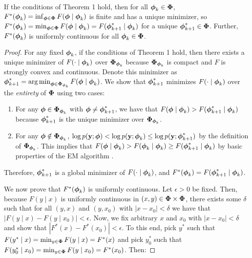 \begin{lemma}
    If the conditions of Theorem 1 hold, then for all $\boldsymbol{\phi}_k \in \boldsymbol{\Phi}$, $F^{*}(\boldsymbol{\phi}_k) = \inf_{\boldsymbol{\phi} \in \boldsymbol{\Phi}} F(\boldsymbol{\phi} \mid \boldsymbol{\phi}_k)$ is finite and has a unique minimizer, so $F^*(\boldsymbol{\phi}_k) = \min_{\boldsymbol{\phi} \in \boldsymbol{\Phi}} F(\boldsymbol{\phi} \mid \boldsymbol{\phi}_k) = F(\boldsymbol{\phi}_{k+1}^* \mid \boldsymbol{\phi}_k)$ for a unique $\boldsymbol{\phi}_{k+1}^* \in \boldsymbol{\Phi}$. Further, $F^*(\boldsymbol{\phi}_k)$ is uniformly continuous for all $\boldsymbol{\phi}_k \in \boldsymbol{\Phi}$.
\end{lemma}

\begin{proof}
    For any fixed $\boldsymbol{\phi}_k$, if the conditions of Theorem 1 hold, then there exists a unique minimizer of $F(\cdot \mid \boldsymbol{\phi}_k)$ over $\boldsymbol{\Phi}_{\boldsymbol{\phi}_{k}}$ because $\boldsymbol{\Phi}_{\boldsymbol{\phi}_{k}}$ is compact and $F$ is strongly convex and continuous. Denote this minimizer as $\boldsymbol{\phi}_{k+1}^* = \operatorname*{arg\,min}_{\boldsymbol{\phi} \in \boldsymbol{\Phi}_{\boldsymbol{\phi}_{k}}} F(\boldsymbol{\phi} \mid \boldsymbol{\phi}_{k})$. We show that $\boldsymbol{\phi}_{k+1}^*$ minimizes $F(\cdot \mid \boldsymbol{\phi}_{k})$ over the \textit{entirety} of $\boldsymbol{\Phi}$ using two cases:
    
    \begin{enumerate}
        \item For any $\boldsymbol{\phi} \in \boldsymbol{\Phi}_{\boldsymbol{\phi}_{k}}$ with $\boldsymbol{\phi} \neq \boldsymbol{\phi}_{k+1}^*$, we have that $F(\boldsymbol{\phi} \mid \boldsymbol{\phi}_{k}) > F(\boldsymbol{\phi}_{k+1}^* \mid \boldsymbol{\phi}_{k})$ because $\boldsymbol{\phi}_{k+1}^*$ is the unique minimizer over $\boldsymbol{\Phi}_{\boldsymbol{\phi}_{k}}$. 
        \item For any $\boldsymbol{\phi} \notin \boldsymbol{\Phi}_{\boldsymbol{\phi}_{k}}$, $\log p(\mathbf{y};\boldsymbol{\phi}) < \log p(\mathbf{y};\boldsymbol{\phi}_k) \leq \log p(\mathbf{y};\boldsymbol{\phi}^*_{k+1})$ by the definition of $\boldsymbol{\Phi}_{\boldsymbol{\phi}_{k}}$. This implies that $F(\boldsymbol{\phi} \mid \boldsymbol{\phi}_{k}) > F(\boldsymbol{\phi}_{k} \mid \boldsymbol{\phi}_{k}) \geq F(\boldsymbol{\phi}^*_{k+1} \mid \boldsymbol{\phi}_{k})$ by basic properties of the EM algorithm \citep{Dempster:1977}.
    \end{enumerate} 

    Therefore, $\boldsymbol{\phi}_{k+1}^*$ is a global minimizer of $F(\cdot \mid \boldsymbol{\phi}_k)$, and $F^{*}(\boldsymbol{\phi}_{k}) = F(\boldsymbol{\phi}_{k+1}^* \mid \boldsymbol{\phi}_k)$.

    We now prove that $F^*(\boldsymbol{\phi}_k)$ is uniformly continuous. Let $\epsilon > 0$ be fixed. Then, because $F(y \mid x)$ is uniformly continuous in $(x,y) \in \boldsymbol{\Phi} \times \boldsymbol{\Phi}$, there exists some $\delta$ such that for all $(y,x)$ and $(y,x_0)$ with $|x-x_0| < \delta$ we have that $|F(y \mid x) - F(y \mid x_0)| < \epsilon$. Now, we fix arbitrary $x$ and $x_0$ with $|x-x_0| < \delta$ and show that $|F^*(x) - F^*(x_0)| < \epsilon$. To this end, pick $y^*$ such that $F(y^* \mid x) = \min_{y \in \boldsymbol{\Phi}} F(y \mid x)= F^*(x)$ and pick $y_0^*$ such that $F(y_0^* \mid x_0) = \min_{y \in \boldsymbol{\Phi}} F(y \mid x_0) = F^*(x_0)$. Then: 
    

\end{proof}
